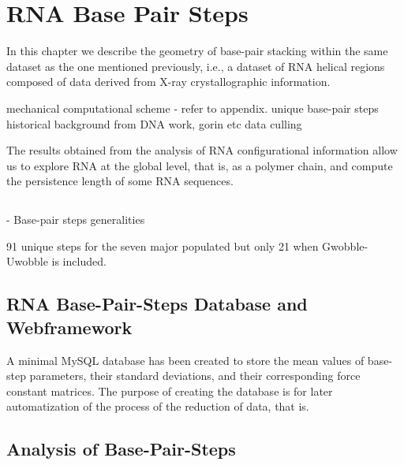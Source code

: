 \chapter{RNA Base Pair Steps}
\label{basepairsteps} 

In this chapter we describe the
geometry  of base-pair  stacking within  the same  dataset as  the one
mentioned previously, i.e., a  dataset of RNA helical regions composed
of data derived from X-ray crystallographic information.

mechanical computational scheme - refer to appendix.
unique base-pair steps
historical background from DNA work, gorin etc
data culling

The   results  obtained   from  the  analysis   of  RNA
configurational  information allow  us to  explore RNA  at  the global
level, that is, as a polymer chain, and compute the persistence length
of some RNA sequences.

\section{}

- Base-pair steps generalities





91 unique steps for the seven major populated but only 21 when
Gwobble-Uwobble is included.
  


\section{RNA Base-Pair-Steps Database and Webframework}
A minimal MySQL database has been  created to store the mean values of
base-step   parameters,   their   standard   deviations,   and   their
corresponding  force constant  matrices. The  purpose of  creating the
database is for  later automatization of the process  of the reduction
of data, that is.

\section{Analysis of Base-Pair-Steps}


